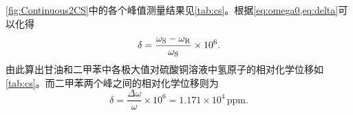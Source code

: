 		\par \cref{fig:Continuous2CS}中的各个峰值测量结果见\cref{tab:cs}。根据\cref{eq:omega0,eq:delta}可以化得
		\begin{equation}
			\delta = \dfrac{\omega_{\rm S}-\omega_{\rm R}}{\omega_{\rm S}}\times 10^{6}.
		\end{equation}
		由此算出甘油和二甲苯中各极大值对硫酸铜溶液中氢原子的相对化学位移如\cref{tab:cs}。而二甲苯两个峰之间的相对化学位移则为
		\begin{equation}
			\delta = \dfrac{\Delta \omega}{\omega}\times 10^{6}=1.171\times 10^{4}\,\mathrm{ppm}.
		\end{equation}
		
